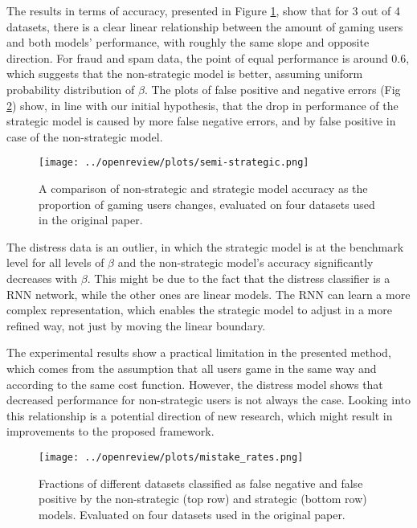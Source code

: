 The results in terms of accuracy, presented in Figure \ref{fig:semi-strat}, show that for 3 out of 4 datasets, there is a clear linear relationship between the amount of gaming users and both models' performance, with roughly the same slope and opposite direction. For fraud and spam data, the point of equal performance is around 0.6, which suggests that the non-strategic model is better, assuming uniform probability distribution of $\beta$. The plots of false positive and negative errors (Fig \ref{fig:confusion}) show, in line with our initial hypothesis, that the drop in performance of the strategic model is caused by more false negative errors, and by false positive in case of the non-strategic model. 

\begin{figure}[h]
    \centering
    \texttt{[image: ../openreview/plots/semi-strategic.png]}
    \caption{A comparison of non-strategic and strategic model accuracy as the proportion of gaming  users changes, evaluated on four datasets used in the original paper. }
    \label{fig:semi-strat}
\end{figure}

The distress data is an outlier, in which the strategic model is at the benchmark level for all levels of $\beta$ and the non-strategic model's accuracy significantly decreases with $\beta$. This might be due to the fact that the distress classifier is a RNN network, while the other ones are linear models. The RNN can learn a more complex representation, which enables the strategic model to adjust in a more refined way, not just by moving the linear boundary. 

The experimental results show a practical limitation in the presented method, which comes from the assumption that all users game in the same way and according to the same cost function. However, the distress model shows that decreased performance for non-strategic users is not always the case. Looking into this relationship is a potential direction of new research, which might result in improvements to the proposed framework.

\begin{figure}[h]
    \centering
    \texttt{[image: ../openreview/plots/mistake\_rates.png]}
    \caption{Fractions of different datasets classified as false negative and false positive by the non-strategic (top row) and strategic (bottom row) models. Evaluated on four datasets used in the original paper. }
    \label{fig:confusion}
\end{figure}

